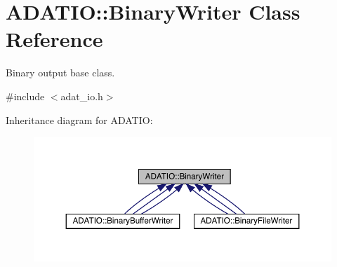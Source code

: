 \hypertarget{classADATIO_1_1BinaryWriter}{}\section{A\+D\+A\+T\+IO\+:\+:Binary\+Writer Class Reference}
\label{classADATIO_1_1BinaryWriter}


Binary output base class.  




{\ttfamily \#include $<$adat\+\_\+io.\+h$>$}



Inheritance diagram for A\+D\+A\+T\+IO\+:
\nopagebreak
\begin{figure}[H]
\begin{center}
\leavevmode
\includegraphics[width=350pt]{d2/df0/classADATIO_1_1BinaryWriter__inherit__graph}
\end{center}
\end{figure}
